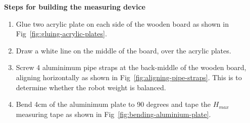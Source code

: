 \textbf{Steps for building the measuring device}
\begin{enumerate}
\item Glue two acrylic plate on each side of the wooden board as shown in
  Fig~\ref{fig:gluing-acrylic-plates}.
\item Draw a white line on the middle of the board, over the acrylic plates.
\item Screw 4 aluminimum pipe straps at the back-middle of the wooden board,
aligning horizontally as shown in Fig~\ref{fig:aligning-pipe-straps}.
This is to determine whether the robot weight is balanced.
\item Bend 4cm of the aluminimum plate to 90 degrees and tape the $H_{max}$
  measuring tape as shown in Fig~\ref{fig:bending-aluminium-plate}.
\end{enumerate}

